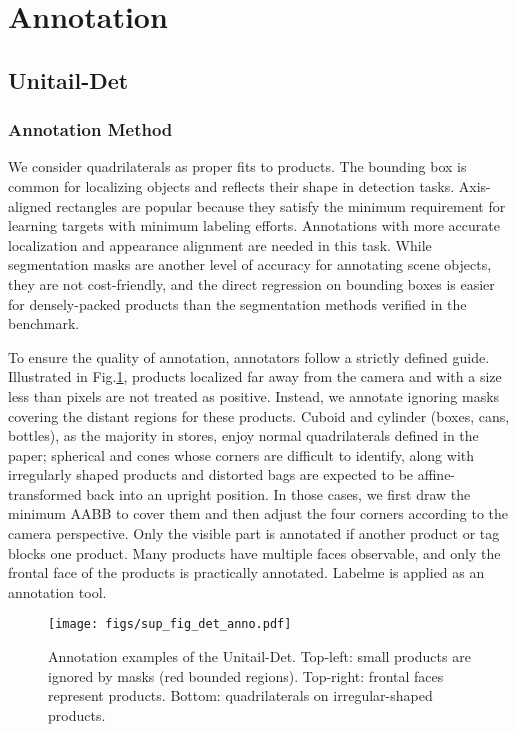 \documentclass[runningheads]{llncs}
\begin{document}
\section{Annotation}
\subsection{Unitail-Det}
\subsubsection{Annotation Method}
We consider quadrilaterals as proper fits to products. The bounding box is common for localizing objects and reflects their shape in detection tasks. Axis-aligned rectangles are popular because they satisfy the minimum requirement for learning targets with minimum labeling efforts. Annotations with more accurate localization and appearance alignment are needed in this task. While segmentation masks are another level of accuracy for annotating scene objects, they are not cost-friendly, and the direct regression on bounding boxes is easier for densely-packed products than the segmentation methods verified in the benchmark. 

To ensure the quality of annotation, annotators follow a strictly defined guide. Illustrated in Fig.\ref{fig:det_anno_examples}, products localized far away from the camera and with a size less than  pixels are not treated as positive. Instead, we annotate ignoring masks covering the distant regions for these products. Cuboid and cylinder (boxes, cans, bottles), as the majority in stores, enjoy normal quadrilaterals defined in the paper; spherical and cones whose corners are difficult to identify, along with irregularly shaped products and distorted bags are expected to be affine-transformed back into an upright position. In those cases, we first draw the minimum AABB to cover them and then adjust the four corners according to the camera perspective. Only the visible part is annotated if another product or tag blocks one product. Many products have multiple faces observable, and only the frontal face of the products is practically annotated. Labelme \cite{wada2018labelme} is applied as an annotation tool.


\begin{figure}[t]
    \centering
    \texttt{[image: figs/sup\_fig\_det\_anno.pdf]}
    \caption{Annotation examples of the Unitail-Det. Top-left: small products are ignored by masks (red bounded regions). Top-right: frontal faces represent products. Bottom: quadrilaterals on irregular-shaped products.}
    \label{fig:det_anno_examples}
\end{figure}
\end{document}
